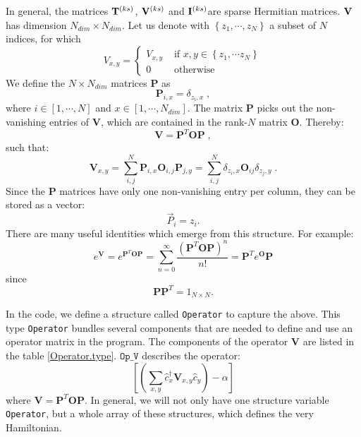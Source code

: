 In general, the matrices ${\bf T}^{(ks)}$, ${\bf V}^{(ks)}$  and   ${\bf I}^{(ks)}$are sparse Hermitian matrices.   
  ${\bf V}$ has dimension  $N_{dim} \times N_{dim} $.  Let us  denote  with  $ \left\{z_{1},\cdots,  z_{N}  \right\}$  a subset  of $N$ indices,  
for which
\begin{equation}
V_{x,y}  =
\left\{\begin{matrix}  V_{x,y}  &  \text{ if }   x,  y  \in \left\{ z_1, \cdots z_N \right\}\\ 
                                  0         &  \text{ otherwise } 
      \end{matrix}\right.
\end{equation}
 We define the $N \times N_{dim}$ matrices $\mathbf{P}$  as
\begin{equation}
\bm{P}_{i,x}=\delta_{z_{i},x}\;,
\end{equation}
where $i \in [1,\cdots, N ]$ and $ x  \in [1,\cdots, N_{dim}]$. The matrix  $\bm{P}$ picks out the non-vanishing entries of $\bm{V}$, 
which are contained in the rank-$N$  matrix $\bm{O}$.  Thereby: 
\begin{equation}
\bm{V} =\bm{P}^{T} \bm{O} \bm{P}\;,
\end{equation}
such that:
\begin{equation}
\bm{V}_{x,y} = \sum\limits_{i,j}^{N}  \bm{P}_{i,x}  \bm{O}_{i,j} \bm{P}_{j,y}=\sum\limits_{i,j}^{N} \delta_{z_{i},x}  \bm{O}_{ij} \delta_{z_{j},y} \;.
\end{equation}
Since  the  $\bm{P}$ matrices have only one non-vanishing entry per column,  they can be stored as a vector:
\begin{equation}
     \vec{P}_i = z_i.
\end{equation}  
There are  many useful  identities which emerge from this  structure. For example: 
\begin{equation}
	e^{\bm{V}} =  e^{\bm{P}^{T} \bm{O} \bm{P}}   = \sum_{n=0}^{\infty}  \frac{\left( \bm{P}^{T} \bm{O} \bm{P} \right)^n}{n!} =  \bm{P}^{T} e^{ \bm{O} } \bm{P}
\end{equation}
since 
\begin{equation}
	 \bm{P} \bm{P}^{T}= 1_{N\times N}.
\end{equation}

In the code, we define a structure called \texttt{Operator} to capture the above. 
This type \texttt{Operator} bundles several components that are needed to define and use an operator matrix in the program.  
The components of the operator $\bm{V} $ are listed in  the table \ref{Operator.type}.   $ \texttt{Op\_V} $  describes the operator:
\begin{equation}
             \left[ \left( \sum_{x,y} \hat{c}^{\dagger}_x \bm{V}_{x,y} \hat{c}^{\phantom{\dagger}}_{y}  \right) - \alpha \right]  
\end{equation}
where $ \bm{V} = \bm{P}^{T} \bm{O} \bm{P}$.  In general, we will not only have one structure variable \texttt{Operator}, but a whole  array of these structures, which defines the very Hamiltonian. 


